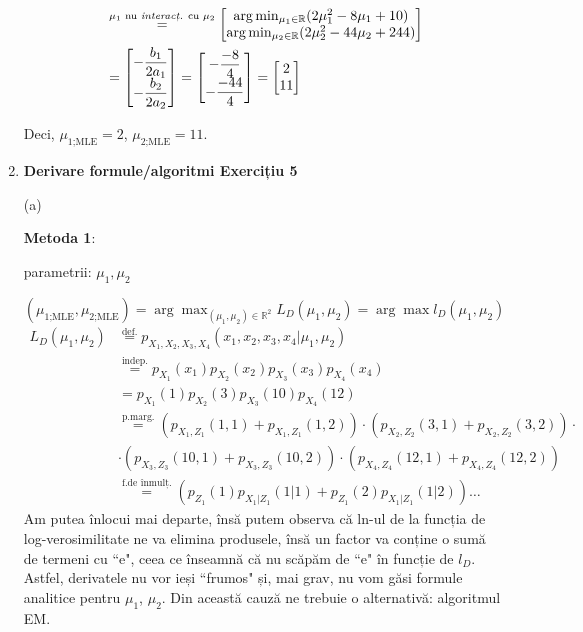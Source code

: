 \documentclass[12pt]{article}
\begin{document}
\begin{enumerate}
\begin{align*}
		&\stackrel{\text{$\mu_1$ nu \textit{interacț.} cu $\mu_2$}}{=} \begin{bmatrix}
		\arg \min_{\mu_1 \in \mathbb{R}} (2\mu_1^2 - 8\mu_1 + 10)\\
		\arg \min_{\mu_2 \in \mathbb{R}} (2\mu_2^2 - 44\mu_2 + 244)\\
		\end{bmatrix}\\
		&=\begin{bmatrix}
		-\dfrac{b_1}{2a_1}\\
		-\dfrac{b_2}{2a_2}
		\end{bmatrix}=\begin{bmatrix}
		-\dfrac{-8}{4}\\
		-\dfrac{-44}{4}
		\end{bmatrix}=\begin{bmatrix}
		2\\
		11
		\end{bmatrix}
		\end{align*}
		
		Deci, $\mu_\text{1;MLE} = 2$, $\mu_\text{2;MLE} = 11$.
		

		
		\item \textbf{Derivare formule/algoritmi Exercițiu 5}
		
		(a)
		
		\textbf{Metoda 1}:
		
		parametrii: $\mu_1,\mu_2$
		
		$(\mu_\text{1;MLE},\mu_\text{2;MLE}) = \arg \max_{(\mu_1,\mu_2) \in \mathbb{R}^2} L_D(\mu_1,\mu_2) = \arg \max l_D(\mu_1,\mu_2)$
		\begin{align*}
		L_D(\mu_1,\mu_2) &\stackrel{\text{def.}}{=} p_{X_1,X_2,X_3,X_4}(x_1,x_2,x_3,x_4|\mu_1,\mu_2)\\
		&\stackrel{\text{indep.}}{=} p_{X_1}(x_1) p_{X_2}(x_2) p_{X_3}(x_3) p_{X_4}(x_4)\\
		&=p_{X_1}(1) p_{X_2}(3) p_{X_3}(10) p_{X_4}(12)\\
		&\stackrel{\text{p.marg.}}{=} (p_{X_1,Z_1}(1,1)+p_{X_1,Z_1}(1,2)) \cdot (p_{X_2,Z_2}(3,1)+p_{X_2,Z_2}(3,2)) \cdot\\
		& \cdot (p_{X_3,Z_3}(10,1)+p_{X_3,Z_3}(10,2)) \cdot (p_{X_4,Z_4}(12,1)+p_{X_4,Z_4}(12,2))\\
		&\stackrel{\text{f.de înmulț.}}{=} \left(p_{Z_1}(1)p_{X_1|Z_1}(1|1) + p_{Z_1}(2) p_{X_1|Z_1}(1|2)\right) \dots
		\end{align*}
		Am putea înlocui mai departe, însă putem observa că ln-ul de la funcția de log-verosimilitate ne va elimina produsele, însă un factor va conține o sumă de termeni cu ``e", ceea ce înseamnă că nu scăpăm de ``e" în funcție de $l_D$. Astfel, derivatele nu vor ieși ``frumos" și, mai grav, nu vom găsi formule analitice pentru $\mu_1$, $\mu_2$. Din această cauză ne trebuie o alternativă: algoritmul EM.
		

\end{enumerate}
\end{document}
